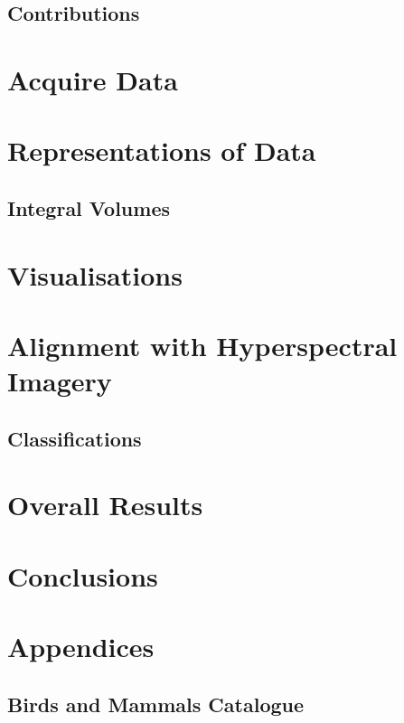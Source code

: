 \documentclass[11pt,nofootinbib]{report}
\begin{document}
		\section{Contributions}\label{Contributions}
			
    \chapter{Acquire Data}\label{AcquireData}
	    
	    \newpage
    \chapter{Representations of Data}\label{Representations}
	    
	    \newpage
		 \section{Integral Volumes}\label{Rep_IntegralVolumes}
		 	
		 		\newpage
		 		
	\chapter{Visualisations}\label{Visualisations}
		
		\newpage
	\chapter{Alignment with Hyperspectral Imagery}\label{Alignment}
		
		\newpage		
		\section{Classifications}\label{Classifications}
			
			\newpage
	\chapter{Overall Results}\label{Results}
		
		\newpage
	\chapter{Conclusions}\label{Conclusions}
		
		\newpage

	    
	    {}

		\newpage
	\chapter{Appendices}\label{Apendices}
		\section{Birds and Mammals Catalogue} 
		\label{AppendixBirds}
		\newpage
	
		
	
    
\end{document}
